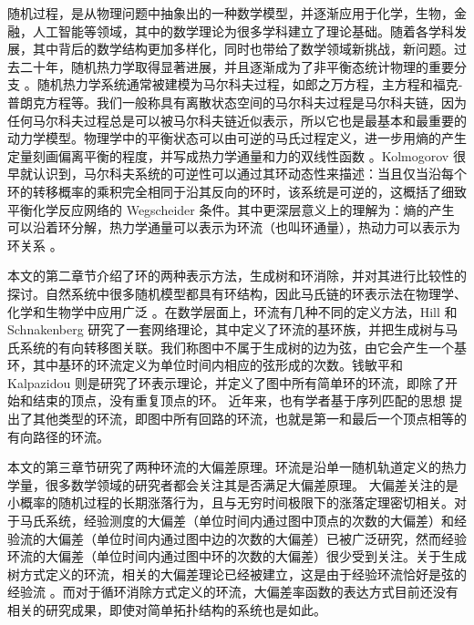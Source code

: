 

随机过程，是从物理问题中抽象出的一种数学模型，并逐渐应用于化学，生物，金融，人工智能等领域，其中的数学理论为很多学科建立了理论基础。随着各学科发展，其中背后的数学结构更加多样化，同时也带给了数学领域新挑战，新问题。过去二十年，随机热力学取得显著进展，并且逐渐成为了非平衡态统计物理的重要分支 \cite{annurev-conmatphys,Seifert_2012,VANDENBROECK20156} 。随机热力学系统通常被建模为马尔科夫过程，如郎之万方程，主方程和福克-普朗克方程等。我们一般称具有离散状态空间的马尔科夫过程是马尔科夫链，因为任何马尔科夫过程总是可以被马尔科夫链近似表示，所以它也是最基本和最重要的动力学模型。物理学中的平衡状态可以由可逆的马氏过程定义，进一步用熵的产生定量刻画偏离平衡的程度，并写成热力学通量和力的双线性函数 \cite{PhysRev.91.1505}。Kolmogorov \cite{Math.Ann.112} 很早就认识到，马尔科夫系统的可逆性可以通过其环动态性来描述：当且仅当沿每个环的转移概率的乘积完全相同于沿其反向的环时，该系统是可逆的，这概括了细致平衡化学反应网络的 Wegscheider 条件。其中更深层意义上的理解为：熵的产生可以沿着环分解，热力学通量可以表示为环流（也叫环通量），热动力可以表示为环关系 \cite{Schnakenberg1976NetworkTO}。

本文的第二章节介绍了环的两种表示方法，生成树和环消除，并对其进行比较性的探讨。自然系统中很多随机模型都具有环结构，因此马氏链的环表示法在物理学、化学和生物学中应用广泛 \cite{ZHANG20121,GE201287}。在数学层面上，环流有几种不同的定义方法，Hill \cite{Hill1966StudiesIIa,Hill1966StudiesIIb,hill2013free} 和 Schnakenberg \cite{Schnakenberg1976NetworkTO} 研究了一套网络理论，其中定义了环流的基环族，并把生成树与马氏系统的有向转移图关联。我们称图中不属于生成树的边为弦，由它会产生一个基环，其中基环的环流定义为单位时间内相应的弦形成的次数。钱敏平\cite{minping1982circulation,jian1984circulations,jiang2004mathematical}和 Kalpazidou \cite{kalpazidou2007cycle} 则是研究了环表示理论，并定义了图中所有简单环的环流，即除了开始和结束的顶点，没有重复顶点的环。
近年来，也有学者基于序列匹配的思想 \cite{roldan2019exact,biddle2020reversal,pietzonka2021cycle} 提出了其他类型的环流，即图中所有回路的环流，也就是第一和最后一个顶点相等的有向路径的环流。

本文的第三章节研究了两种环流的大偏差原理。环流是沿单一随机轨道定义的热力学量，很多数学领域的研究者都会关注其是否满足大偏差原理\cite{varadhan1984large,den2000large}。
大偏差关注的是小概率的随机过程的长期涨落行为，且与无穷时间极限下的涨落定理密切相关。对于马氏系统，经验测度的大偏差（单位时间内通过图中顶点的次数的大偏差）和经验流的大偏差（单位时间内通过图中边的次数的大偏差）已被广泛研究，然而经验环流的大偏差（单位时间内通过图中环的次数的大偏差）很少受到关注。关于生成树方式定义的环流，相关的大偏差理论已经被建立，这是由于经验环流恰好是弦的经验流 \cite{bertini2015flows,bertini2015large}。而对于循环消除方式定义的环流，大偏差率函数的表达方式目前还没有相关的研究成果，即使对简单拓扑结构的系统也是如此。

